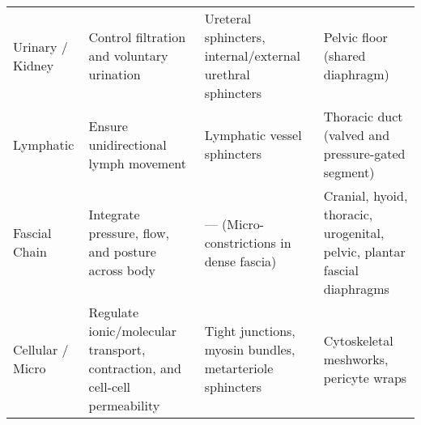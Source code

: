 \documentclass{article}
\begin{document}
\begin{landscape}
\begin{tabular}{>{\raggedright\arraybackslash}p{4cm} >{\raggedright\arraybackslash}p{6cm} >{\raggedright\arraybackslash}p{5.5cm} >{\raggedright\arraybackslash}p{5.5cm}}
Urinary / Kidney & Control filtration and voluntary urination &
Ureteral sphincters, internal/external urethral sphincters &
Pelvic floor (shared diaphragm) \\

Lymphatic & Ensure unidirectional lymph movement &
Lymphatic vessel sphincters &
Thoracic duct (valved and pressure-gated segment) \\

Fascial Chain & Integrate pressure, flow, and posture across body &
— (Micro-constrictions in dense fascia) &
Cranial, hyoid, thoracic, urogenital, pelvic, plantar fascial diaphragms \\

Cellular / Micro & Regulate ionic/molecular transport, contraction, and cell-cell permeability &
Tight junctions, myosin bundles, metarteriole sphincters &
Cytoskeletal meshworks, pericyte wraps \\

\bottomrule
\end{tabular}

\end{landscape}
\end{document}

